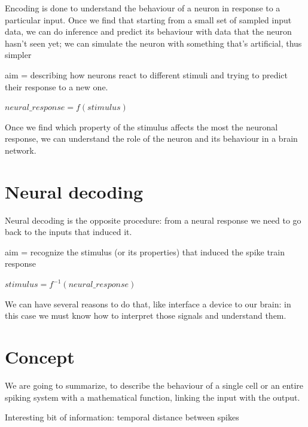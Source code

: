 \documentclass[12pt]{article}
\begin{document}
\vspace{20px}

Encoding is done to understand the behaviour of a neuron in response to a particular input. Once we find that starting from a small set of sampled input data, we can do inference and predict its behaviour with data that the neuron hasn't seen yet; we can simulate the neuron with something that's artificial, thus simpler 

\begin{center}
	aim = describing how neurons react to different stimuli and trying to predict their response to a new one.
\end{center}

\begin{center}
	$neural\_response = f(stimulus)$
\end{center}

Once we find which property of the stimulus affects the most the neuronal response, we can understand the role of the neuron and its behaviour in a brain network.

\section{Neural decoding}

Neural decoding is the opposite procedure: from a neural response we need to go back to the inputs that induced it.

\begin{center}
	aim = recognize the stimulus (or its properties) that induced the spike train response
\end{center}

\begin{center}
$stimulus = f^{-1}(neural\_response)$
\end{center}

We can have several reasons to do that, like interface a device to our brain: in this case we must know how to interpret those signals and understand them.

\section{Concept}

We are going to summarize, to describe the behaviour of a single cell or an entire spiking system with a mathematical function, linking the input with the output.

\begin{center}
	Interesting bit of information: temporal distance between spikes
\end{center}
\end{document}
